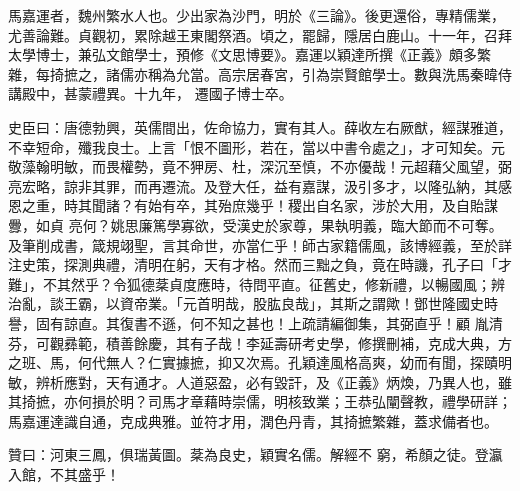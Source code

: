 \begin{pinyinscope}
 馬嘉運者，魏州繁水人也。少出家為沙門，明於《三論》。後更還俗，專精儒業，尤善論難。貞觀初，累除越王東閣祭酒。頃之，罷歸，隱居白鹿山。十一年，召拜太學博士，兼弘文館學士，預修《文思博要》。嘉運以穎達所撰《正義》頗多繁雜，每掎摭之，諸儒亦稱為允當。高宗居春宮，引為崇賢館學士。數與洗馬秦暐侍講殿中，甚蒙禮異。十九年，
 遷國子博士卒。



 史臣曰：唐德勃興，英儒間出，佐命協力，實有其人。薛收左右厥猷，經謀雅道，不幸短命，殲我良士。上言「恨不圖形，若在，當以中書令處之」，才可知矣。元敬藻翰明敏，而畏權勢，竟不狎房、杜，深沉至慎，不亦優哉！元超藉父風望，弼亮宏略，諒非其罪，而再遷流。及登大任，益有嘉謀，汲引多才，以隆弘納，其感恩之重，時其聞諸？有始有卒，其殆庶幾乎！稷出自名家，涉於大用，及自貽謀釁，如貞
 亮何？姚思廉篤學寡欲，受漢史於家尊，果執明義，臨大節而不可奪。及筆削成書，箴規翊聖，言其命世，亦當仁乎！師古家籍儒風，該博經義，至於詳注史策，探測典禮，清明在躬，天有才格。然而三黜之負，竟在時譏，孔子曰「才難」，不其然乎？令狐德棻貞度應時，待問平直。征舊史，修新禮，以暢國風；辨治亂，談王霸，以資帝業。「元首明哉，股肱良哉」，其斯之謂歟！鄧世隆國史時譽，固有諒直。其復書不遜，何不知之甚也！上疏請編御集，其弼直乎！顧
 胤清芬，可觀彞範，積善餘慶，其有子哉！李延壽研考史學，修撰刪補，克成大典，方之班、馬，何代無人？仁實據摭，抑又次焉。孔穎達風格高爽，幼而有聞，探賾明敏，辨析應對，天有通才。人道惡盈，必有毀訐，及《正義》炳煥，乃異人也，雖其掎摭，亦何損於明？司馬才章藉時崇儒，明核致業；王恭弘闡聲教，禮學研詳；馬嘉運達識自通，克成典雅。並符才用，潤色丹青，其掎摭繁雜，蓋求備者也。



 贊曰：河東三鳳，俱瑞黃圖。棻為良史，穎實名儒。解經不
 窮，希顏之徒。登瀛入館，不其盛乎！



\end{pinyinscope}